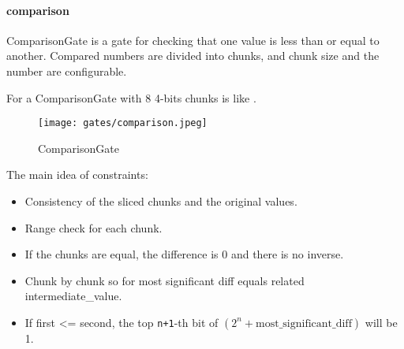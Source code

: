 \paragraph{comparison}

ComparisonGate is a gate for checking that one value is less than or equal to another. 
Compared numbers are divided into chunks, and chunk size and the number are configurable.

For a ComparisonGate with 8 4-bits chunks is like .

\begin{figure}[!ht]
    \centering
    \texttt{[image: gates/comparison.jpeg]}
    \caption{ComparisonGate}
    \label{fig:comparison}
\end{figure}

The main idea of constraints:
\begin{itemize}
    \item Consistency of the sliced chunks and the original values.
    \item Range check for each chunk.
    \item If the chunks are equal, the difference is 0 and there is no inverse.
    \item Chunk by chunk so for most significant diff equals related intermediate\_value.
    \item If first <= second, the top \verb|n+1|-th bit of $(2^n + \text{most\_significant\_diff})$ will be 1.
\end{itemize}
